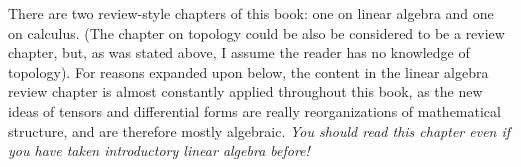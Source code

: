 There are two review-style chapters of this book: one on linear algebra and one on calculus. (The chapter on topology could be also be considered to be a review chapter, but, as was stated above, I assume the reader has no knowledge of topology). For reasons expanded upon below, the content in the linear algebra review chapter is almost constantly applied throughout this book, as the new ideas of tensors and differential forms are really reorganizations of mathematical structure, and are therefore mostly algebraic. \textit{You should read this chapter even if you have taken introductory linear algebra before!}